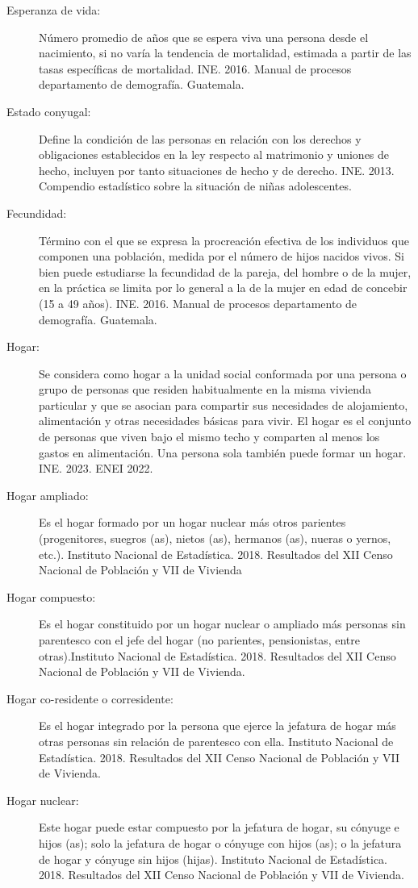 \begin{description}
	\item [Esperanza de vida:] Número promedio de años que se espera viva una persona desde el nacimiento, si no varía la tendencia de mortalidad, estimada a partir de las tasas específicas de mortalidad. INE. 2016. Manual de procesos departamento de demografía. Guatemala.
	\item[Estado conyugal:] Define la condición de las personas en relación con los derechos y obligaciones establecidos en la ley respecto al matrimonio y uniones de hecho, incluyen por tanto situaciones de hecho y de derecho. INE. 2013.  Compendio estadístico sobre la situación de niñas adolescentes.
	\item[Fecundidad:] Término con el que se expresa la procreación efectiva de los individuos que componen una población, medida por el número de hijos nacidos vivos. Si bien puede estudiarse la fecundidad de la pareja, del hombre o de la mujer, en la práctica se limita por lo general a la de la mujer en edad de concebir (15 a 49 años). INE. 2016. Manual de procesos departamento de demografía. Guatemala.
	\item[Hogar:] Se considera como hogar a la unidad social conformada por una persona o grupo de personas que residen habitualmente en la misma vivienda particular y que se asocian para compartir sus necesidades de alojamiento, alimentación y otras necesidades básicas para vivir. El hogar es el conjunto de personas que viven bajo el mismo techo y comparten al menos los gastos en alimentación. Una persona sola también puede formar un hogar. INE. 2023. ENEI 2022.
	\item[Hogar ampliado:] Es el hogar formado por un hogar nuclear más otros parientes (progenitores, suegros (as), nietos (as), hermanos (as), nueras o yernos, etc.). Instituto Nacional de Estadística. 2018. Resultados del XII Censo Nacional de Población y VII de Vivienda
	\item[Hogar compuesto:] Es el hogar constituido por un hogar nuclear o ampliado más personas sin parentesco con el jefe del hogar (no parientes, pensionistas, entre otras).Instituto Nacional de Estadística. 2018. Resultados del XII Censo Nacional de Población y VII de Vivienda.
	\item[Hogar co-residente o corresidente:] Es el hogar integrado por la persona que ejerce la jefatura de hogar más otras personas sin relación de parentesco con ella. Instituto Nacional de Estadística. 2018. Resultados del XII Censo Nacional de Población y VII de Vivienda.
	\item[Hogar nuclear:] Este hogar puede estar compuesto por la jefatura de hogar, su cónyuge e hijos (as); solo la jefatura de hogar o cónyuge con hijos (as); o la jefatura de hogar y cónyuge sin hijos (hijas). Instituto Nacional de Estadística. 2018. Resultados del XII Censo Nacional de Población y VII de Vivienda.

\end{description}
